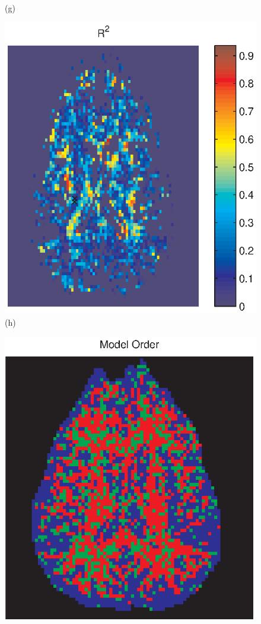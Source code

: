\documentclass[authoryear,preprint,12pt]{elsarticle}
\begin{document}
\begin{figure}[p]
\begin{center}
\begin{minipage}[]{.30\textwidth}
       (g)
      \end{minipage}
      \begin{minipage}[]{.30\textwidth}
      \centering
      \includegraphics[width=\textwidth]{rsq255ny.eps}
       (h)
      \end{minipage}
      \begin{minipage}[]{.30\textwidth}
      \centering
      \includegraphics[width=\textwidth]{modelorderchosen2bac.eps}

\end{minipage}
\end{center}
\end{figure}
\end{document}
